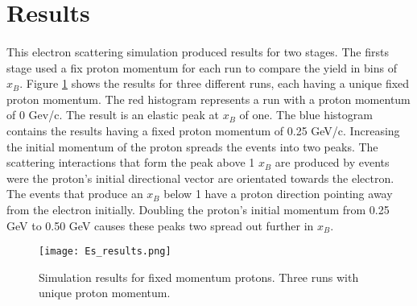 \section{Results}
\paragraph{}This electron scattering simulation produced results for two stages. The firsts stage used a fix proton momentum for each run to compare the yield in bins of $x_B$. Figure \ref{ES_res} shows the results for three different runs, each having a unique fixed proton momentum. The red histogram represents a run with a proton momentum of 0 Gev/c. The result is an elastic peak at $x_B$ of one. The blue histogram contains the results having a fixed proton momentum of 0.25 GeV/c. Increasing the initial momentum of the proton spreads the events into two peaks. The scattering interactions that form the peak above 1 $x_B$ are produced by events were the proton's initial directional vector are orientated towards the electron. The events that produce an $x_B$ below 1 have a proton direction pointing away from the electron initially. Doubling the proton's initial momentum from 0.25 GeV to 0.50 GeV causes these peaks two spread out further in $x_B$.  


\begin{figure}[t]
\centering
\texttt{[image: Es\_results.png]}
\caption{Simulation results for fixed momentum protons. Three runs with unique proton momentum. }
\label{ES_res}
\end{figure}

